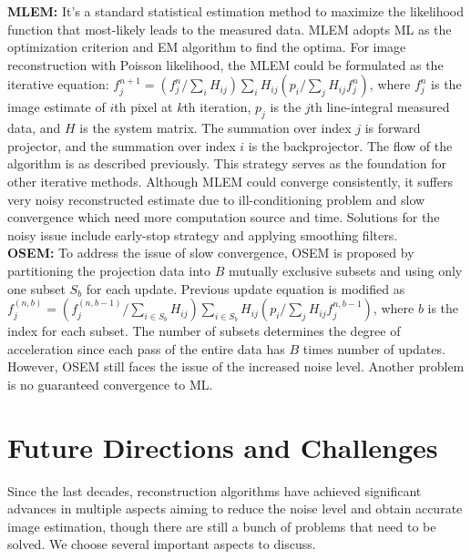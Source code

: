\documentclass[11pt,a4paper]{article}
\begin{document}
    \textbf{MLEM:} It's a standard statistical estimation method to maximize the likelihood function that most-likely leads to the measured data. MLEM adopts ML as the optimization criterion and EM algorithm to find the optima. For image reconstruction with Poisson likelihood, the MLEM could be formulated as the iterative equation: $f_j^{n+1}=(f_j^n/\sum_iH_{ij})\sum_iH_{ij}(p_i/\sum_jH_{ij}f_j^n)$, where $f_j^n$ is the image estimate of $i$th pixel at $k$th iteration, $p_j$ is the $j$th line-integral measured data, and $H$ is the system matrix. The summation over index $j$ is forward projector, and the summation over index $i$ is the backprojector. The flow of the algorithm is as described previously. This strategy serves as the foundation for other iterative methods. Although MLEM could converge consistently, it suffers very noisy reconstructed estimate due to ill-conditioning problem and slow convergence which need more computation source and time. Solutions for the noisy issue include early-stop strategy and applying smoothing filters.\cite{tong2010petctreview}\\
    \textbf{OSEM:} To address the issue of slow convergence, OSEM is proposed by partitioning the projection data into $B$ mutually exclusive subsets and using only one subset $S_b$ for each update. Previous update equation is modified as $f_j^{(n,b)}=(f_j^{(n,b-1)}/\sum_{i\in S_b}H_{ij})\sum_{i\in S_b}H_{ij}(p_i/\sum_jH_{ij}f_j^{n,b-1})$, where $b$ is the index for each subset. The number of subsets determines the degree of acceleration since each pass of the entire data has $B$ times number of updates. However, OSEM still faces the issue of the increased noise level. Another problem is no guaranteed convergence to ML\cite{portnow2013history}.
    
    \vspace{-0.5cm}
    \section{Future Directions and Challenges}
    \label{sec:future}
    Since the last decades, reconstruction algorithms have achieved significant advances in multiple aspects aiming to reduce the noise level and obtain accurate image estimation, though there are still a bunch of problems that need to be solved. We choose several important aspects to discuss. 
    
\end{document}
